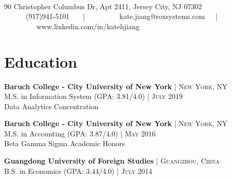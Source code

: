 \documentclass[10pt]{article} %
\begin{document}
\color{text1} %


\par{\\[0.5\baselineskip] %

{ 90 Christopher Columbus Dr, Apt 2411, Jersey City, NJ 07302}\\

{\ \ \ \faMobilePhone \ \ \  (917)941-5101 \ \ \ | \ \ \  
\  \ \ \faEnvelope \ \ \ kate.jiang@roxsystems.com\ \ \ | \ \ \
\  \ \ \faLinkedin \ \ \ www.linkedin.com/in/katehjiang }
	


\begin{minipage}[t]{0.5\textwidth} %
\vspace{0pt} %


\section{Education} 

\textbf{Baruch College - City University of New York} {\hfill\footnotesize\textsc{| New York, NY}}\\
M.S. in Information System {\footnotesize\textsc{(GPA: 3.81/4.0)}} {\hfill\footnotesize\textsc{| July 2019}}\\
Data Analytics Concentration 

\textbf{Baruch College - City University of New York} {\hfill\footnotesize\textsc{| New York, NY}}\\
M.S. in Accounting {\footnotesize\textsc{(GPA: 3.87/4.0)}} {\hfill\footnotesize\textsc{| May 2016}}\\
Beta Gamma Sigma Academic Honors 

\textbf{Guangdong University of Foreign Studies} {\hfill\footnotesize\textsc{| Guangzhou, China}}\\
B.S. in Economics {\footnotesize\textsc{(GPA: 3.44/4.0)}} {\hfill\footnotesize\textsc{| July 2014}}


\end{minipage}}
\end{document}
